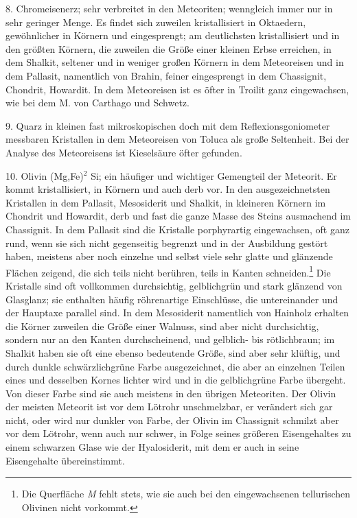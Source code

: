 \documentclass[a4paper, 11pt, oneside]{article}
\begin{document}
8. Chromeisenerz; sehr verbreitet in den Meteoriten; wenngleich immer nur in sehr geringer Menge. Es findet sich zuweilen kristallisiert in Oktaedern, gewöhnlicher in Körnern und eingesprengt; am deutlichsten kristallisiert und in den größten Körnern, die zuweilen die Größe einer kleinen Erbse erreichen, in dem Shalkit, seltener und in weniger großen Körnern in dem Meteoreisen und in dem Pallasit, namentlich von Brahin, feiner eingesprengt in dem Chassignit, Chondrit, Howardit. In dem Meteoreisen ist es öfter in Troilit ganz eingewachsen, wie bei dem M. von Carthago und Schwetz.

9. Quarz in kleinen fast mikroskopischen doch mit dem Reflexionsgoniometer messbaren Kristallen in dem Meteoreisen von Toluca als große Seltenheit. Bei der Analyse des Meteoreisens ist Kieselsäure öfter gefunden.

10. Olivin (Mg,Fe)$^{2}$ Si; ein häufiger und wichtiger Gemengteil der Meteorit. Er kommt kristallisiert, in Körnern und auch derb vor. In den ausgezeichnetsten Kristallen in dem Pallasit, Mesosiderit und Shalkit, in kleineren Körnern im Chondrit und Howardit, derb und fast die ganze Masse des Steins ausmachend im Chassignit. In dem Pallasit sind die Kristalle porphyrartig eingewachsen, oft ganz rund, wenn sie sich nicht gegenseitig begrenzt und in der Ausbildung gestört haben, meistens aber noch einzelne und selbst viele sehr glatte und glänzende Flächen zeigend, die sich teils nicht berühren, teils in Kanten schneiden.\footnote{Die Querfläche \emph{M} fehlt stets, wie sie auch bei den eingewachsenen tellurischen Olivinen nicht vorkommt.} Die Kristalle sind oft vollkommen durchsichtig, gelblichgrün und stark glänzend von Glasglanz; sie enthalten häufig röhrenartige Einschlüsse, die untereinander und der Hauptaxe parallel sind. In dem Mesosiderit namentlich von Hainholz erhalten die Körner zuweilen die Größe einer Walnuss, sind aber nicht durchsichtig, sondern nur an den Kanten durchscheinend, und gelblich- bis rötlichbraun; im Shalkit haben sie oft eine ebenso bedeutende Größe, sind aber sehr klüftig, und durch dunkle schwärzlichgrüne Farbe ausgezeichnet, die aber an einzelnen Teilen eines und desselben Kornes lichter wird und in die gelblichgrüne Farbe übergeht. Von dieser Farbe sind sie auch meistens in den übrigen Meteoriten. Der Olivin der meisten Meteorit ist vor dem Lötrohr unschmelzbar, er verändert sich gar nicht, oder wird nur dunkler von Farbe, der Olivin im Chassignit schmilzt aber vor dem Lötrohr, wenn auch nur schwer, in Folge seines größeren Eisengehaltes zu einem schwarzen Glase wie der Hyalosiderit, mit dem er auch in seine Eisengehalte übereinstimmt.
\end{document}
